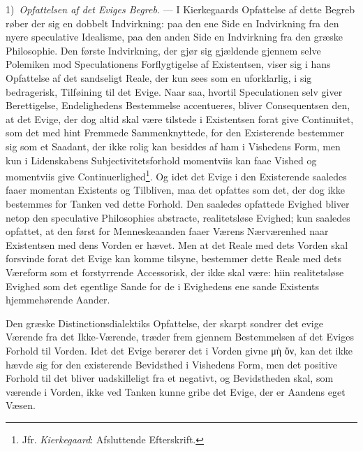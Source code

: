 \documentclass[12pt,a4paper]{book}
\newcommand{\opage}[1]{\marginnote{\footnotesize\textit{[#1]}}}
\begin{document}
1)~\emph{Opfattelsen af det Eviges Begreb.} --- I Kierkegaards Opfattelse af dette Begreb røber
der sig en dobbelt Indvirkning: paa den ene Side en Indvirkning fra den nyere speculative
Idealisme, paa den anden Side en Indvirkning fra den græske Philosophie. Den første Indvirkning,
der gjør sig gjældende gjennem selve Polemiken mod Speculationens Forflygtigelse af Existentsen,
viser sig i hans Opfattelse af det sandseligt Reale, der kun sees som en uforklarlig, i sig
bedragerisk, Tilføining til det Evige. Naar saa, hvortil Speculationen selv giver Berettigelse,
Endelighedens Bestemmelse accentueres, bliver Consequentsen den, at det Evige, der dog altid skal
være tilstede i Existentsen forat give Continuitet, som det med hint Fremmede Sammenknyttede, for
den Existerende bestemmer sig som et Saadant, der ikke rolig kan besiddes af ham i Vishedens Form,
men kun i Lidenskabens Subjectivitetsforhold momentviis kan faae Vished og momentviis give
\opage{217}Continuerlighed\footnote{Jfr. \emph{Kierkegaard}: Afsluttende Efterskrift.}. Og idet det Evige i den
Existerende saaledes faaer momentan Existents og Tilbliven, maa det opfattes som det, der dog
ikke bestemmes for Tanken ved dette Forhold. Den saaledes opfattede Evighed bliver netop den
speculative Philosophies abstracte, realitetsløse Evighed; kun saaledes opfattet, at den først
for Menneskeaanden faaer Værens Nærværenhed naar Existentsen med dens Vorden er hævet. Men at det
Reale med dets Vorden skal forsvinde forat det Evige kan komme tilsyne, bestemmer dette Reale med
dets Væreform som et forstyrrende Accessorisk, der ikke skal være: hiin realitetsløse Evighed som
det egentlige Sande for de i Evighedens ene sande Existents hjemmehørende Aander.

Den græske Distinctionsdialektiks Opfattelse, der skarpt sondrer det evige Værende fra det
Ikke-Værende, træder frem gjennem Bestemmelsen af det Eviges Forhold til Vorden. Idet det Evige
berører det i Vorden givne μὴ ὄν, kan det ikke hævde sig for den existerende Bevidsthed i
Vishedens Form, men det positive Forhold til det bliver uadskilleligt fra et negativt, og
Bevidstheden skal, som værende i Vorden, ikke ved Tanken kunne gribe det Evige, der er Aandens
eget Væsen.
\end{document}
